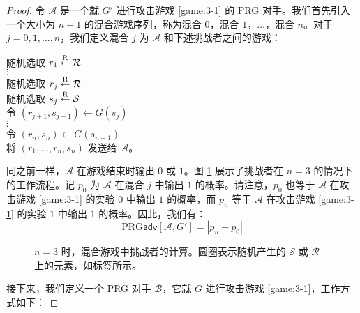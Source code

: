 \begin{proof}
令 $\mathcal A$ 是一个就 $G'$ 进行攻击游戏 \ref{game:3-1} 的 PRG 对手。我们首先引入一个大小为 $n+1$ 的混合游戏序列，称为混合 $0$，混合 $1$，$\dots$，混合 $n$。对于 $j=0,1,\dots,n$，我们定义混合 $j$ 为 $\mathcal A$ 和下述挑战者之间的游戏：

\vspace*{10pt}

\hspace*{5pt} 随机选取 $r_1\overset{\rm R}\leftarrow\mathcal R$\\
\hspace*{50pt} $\vdots$\\
\hspace*{26pt} 随机选取 $r_j\overset{\rm R}\leftarrow\mathcal R$\\
\hspace*{26pt} 随机选取 $s_j\overset{\rm R}\leftarrow\mathcal S$\\
\hspace*{26pt} 令 $(r_{j+1},s_{j+1})\leftarrow G(s_{j})$\\
\hspace*{50pt} $\vdots$\\
\hspace*{26pt} 令 $(r_n,s_{n})\leftarrow G(s_{n-1})$\\
\hspace*{26pt} 将 $(r_1,\dots,r_n,s_n)$ 发送给 $\mathcal A$。

\vspace*{10pt}

\noindent
同之前一样，$\mathcal A$ 在游戏结束时输出 $0$ 或 $1$。图 \ref{fig:3-7} 展示了挑战者在 $n=3$ 的情况下的工作流程。记 $p_0$ 为 $\mathcal A$ 在混合 $j$ 中输出 $1$ 的概率。请注意，$p_0$ 也等于 $\mathcal A$ 在攻击游戏 \ref{game:3-1} 的实验 $0$ 中输出 $1$ 的概率，而 $p_n$ 等于 $\mathcal A$ 在攻击游戏 \ref{game:3-1} 的实验 $1$ 中输出 $1$ 的概率。因此，我们有：
\begin{equation}
\mathrm{PRG}\mathsf{adv}[\mathcal{A},G']
=|p_n-p_0|
\end{equation}

\begin{figure}
	\centering
	
	\caption{$n=3$ 时，混合游戏中挑战者的计算。圆圈表示随机产生的 $\mathcal{S}$ 或 $\mathcal{R}$ 上的元素，如标签所示。}
	\label{fig:3-7}
\end{figure}

接下来，我们定义一个 PRG 对手 $\mathcal B$，它就 $G$ 进行攻击游戏 \ref{game:3-1}，工作方式如下：


\end{proof}
